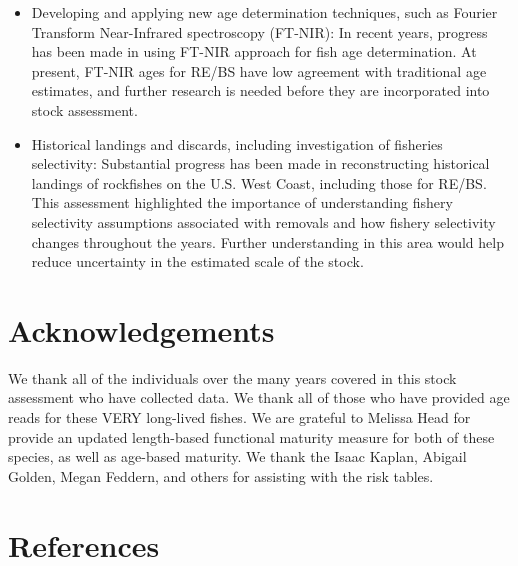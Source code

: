 \documentclass[
]{scrartcl}
\begin{document}
\begin{itemize}
  mortality fixed at the median of the prior. The collection of
  additional age data and further research of the life-history of RE/BS
  may improve our understanding of RE/BS natural mortality.
\item
  Developing and applying new age determination techniques, such as
  Fourier Transform Near-Infrared spectroscopy (FT-NIR): In recent
  years, progress has been made in using FT-NIR approach for fish age
  determination. At present, FT-NIR ages for RE/BS have low agreement
  with traditional age estimates, and further research is needed before
  they are incorporated into stock assessment.
\item
  Historical landings and discards, including investigation of fisheries
  selectivity: Substantial progress has been made in reconstructing
  historical landings of rockfishes on the U.S. West Coast, including
  those for RE/BS. This assessment highlighted the importance of
  understanding fishery selectivity assumptions associated with removals
  and how fishery selectivity changes throughout the years. Further
  understanding in this area would help reduce uncertainty in the
  estimated scale of the stock.
\end{itemize}

\newpage{}

\section{Acknowledgements}\label{sec-acknowledgements}

We thank all of the individuals over the many years covered in this
stock assessment who have collected data. We thank all of those who have
provided age reads for these VERY long-lived fishes. We are grateful to
Melissa Head for provide an updated length-based functional maturity
measure for both of these species, as well as age-based maturity. We
thank the Isaac Kaplan, Abigail Golden, Megan Feddern, and others for
assisting with the risk tables.

\newpage{}

\section{References}\label{references}
\end{document}
